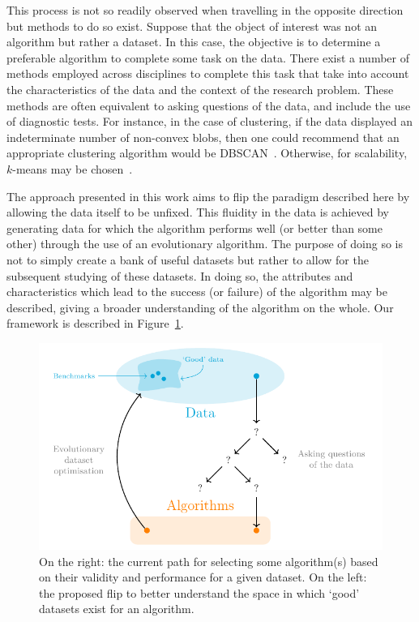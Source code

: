 \documentclass[smallextended]{svjour3}
\begin{document}
This process is not so readily observed when travelling in the opposite
direction but methods to do so exist. Suppose that the object of interest was
not an algorithm but rather a dataset. In this case, the objective is to
determine a preferable algorithm to complete some task on the data.  There exist
a number of methods employed across disciplines to complete this task that take
into account the characteristics of the data and the context of the research
problem. These methods are often equivalent to asking questions of the data, and
include the use of diagnostic tests. For instance, in the case of clustering, if
the data displayed an indeterminate number of non-convex blobs, then one could
recommend that an appropriate clustering algorithm would be
DBSCAN~\cite{Ester1996}. Otherwise, for scalability, \(k\)-means may be
chosen~\cite{Wu2009,Zhao2009}.

The approach presented in this work aims to flip the paradigm described here by
allowing the data itself to be unfixed. This fluidity in the data is achieved by
generating data for which the algorithm performs well (or better than some
other) through the use of an evolutionary algorithm. The purpose of doing so is
not to simply create a bank of useful datasets but rather to allow for the
subsequent studying of these datasets. In doing so, the attributes and
characteristics which lead to the success (or failure) of the algorithm may be
described, giving a broader understanding of the algorithm on the whole. Our
framework is described in Figure~\ref{fig:paradigm}.

\begin{figure}[htbp]
    \centering
    \includegraphics{Fig1.pdf}
    \caption{%
        On the right: the current path for selecting some algorithm(s) based on
        their validity and performance for a given dataset. On the left: the
        proposed flip to better understand the space in which `good' datasets
        exist for an algorithm.
    }\label{fig:paradigm}
\end{figure}
\end{document}
